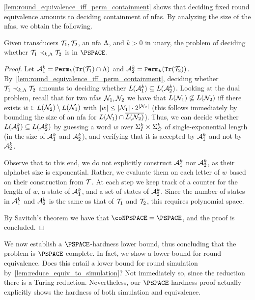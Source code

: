 \autoref{lem:round_equivalence_iff_perm_containment} shows that deciding fixed round equivalence amounts to deciding containment of \glspl{nfa}. By analyzing the size of the \glspl{nfa}, we obtain the following.
\begin{theorem}
	\label{thm:fixed_re_PSPACE}
	Given transducers $\mathcal{T}_1,\mathcal{T}_2$, an \gls{nfa} $\Lambda$, and $k>0$ in unary, the problem of deciding whether $\mathcal{T}_1\prec_{k,\Lambda}\mathcal{T}_2$ is in $\PSPACE$.
\end{theorem}
\begin{proof}
	Let $\mathcal{A}_1^k={\mathtt{Perm}}_k({\mathtt{Tr}}(\mathcal{T}_1)\cap \Lambda)$ and $\mathcal{A}_2^k={\mathtt{Perm}}_k({\mathtt{Tr}}(\mathcal{T}_2))$. By~\cref{lem:round_equivalence_iff_perm_containment}, deciding whether $\mathcal{T}_1\prec_{k,\Lambda} \mathcal{T}_2$ amounts to deciding whether $L(\mathcal{A}^k_1)\subseteq L(\mathcal{A}^k_2)$. Looking at the dual problem, recall that for two \glspl{nfa} $\mathcal{N}_1, \mathcal{N}_2$ we have that $L(\mathcal{N}_1)\not\subseteq L(\mathcal{N}_2)$ iff 
	there exists $w\in L(\mathcal{N}_2)\setminus L(\mathcal{N}_1)$ with $|w|\le |\mathcal{N}_1|\cdot 2^{|\mathcal{N}_2|}$ (this follows immediately by bounding the size of an \gls{nfa} for $L(\mathcal{N}_1)\cap \overline{L(\mathcal{N}_2)}$). Thus, we can decide whether $L(\mathcal{A}^k_1)\subseteq L(\mathcal{A}^k_2)$ by guessing a word $w$ over $\Sigma_{I}^k\times \Sigma_{O}^k$ of single-exponential length (in the size of $\mathcal{A}^k_1$ and $\mathcal{A}^k_2$), and verifying that it is accepted by $\mathcal{A}^k_1$ and not by $\mathcal{A}^k_2$. 
	
	Observe that to this end, we do not explicitly construct $\mathcal{A}^k_1$ nor $\mathcal{A}^k_2$, as their alphabet size is exponential. Rather, we evaluate them on each letter of $w$ based on their construction from $\mathcal{T}$. At each step we keep track of a counter for the length of $w$, a state of $\mathcal{A}^k_1$, and a set of states of $\mathcal{A}^k_2$. Since the number of states in $\mathcal{A}^k_1$ and $\mathcal{A}^k_2$ is the same as that of $\mathcal{T}_1$ and $\mathcal{T}_2$, this requires polynomial space.
	
	By Savitch's theorem we have that $\coNPSPACE=\PSPACE$, and the proof is concluded.
\end{proof}

We now establish a $\PSPACE$-hardness lower bound, thus concluding that the problem is $\PSPACE$-complete. In fact, we show a lower bound for round equivalence. Does this entail a lower bound for round simulation by~\cref{lem:reduce_equiv_to_simulation}? Not immediately so, since the reduction there is a Turing reduction. Nevertheless, our $\PSPACE$-hardness proof actually explicitly shows the hardness of both simulation and equivalence.

